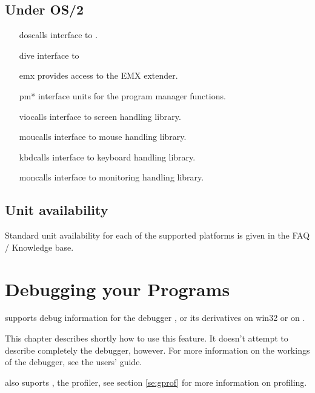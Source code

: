 \section{Under OS/2}
\begin{itemize}
\item [doscalls] interface to .
\item [dive] interface to 
\item [emx] provides access to the EMX extender.
\item [pm*] interface units for the program manager functions.
\item [viocalls] interface to  screen handling library.
\item [moucalls] interface to  mouse handling library.
\item [kbdcalls] interface to  keyboard handling library.
\item [moncalls] interface to  monitoring handling library.
\end{itemize}

\section{Unit availability}

Standard unit availability for each of the supported platforms 
is given in the FAQ / Knowledge base. 



\chapter{Debugging your Programs}

\fpc supports debug information for the \gnu debugger , or
its derivatives  on win32 or  on \linux.

This chapter describes shortly how to use this feature. It doesn't attempt
to describe completely the \gnu debugger, however.
For more information on the workings of the \gnu debugger, see the 
users' guide.

\fpc also suports , the \gnu profiler, see section \ref{se:gprof}
for more information on profiling.

